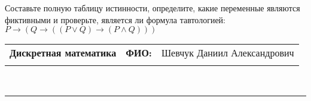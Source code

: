 \documentclass[10pt]{exam}
\newcommand{\class}{Дискретная математика}
\newcommand{\examdate}{}
\begin{document}
\begin{questions}
\begin{enumerate}[a)]
\end{enumerate}\question Составьте полную таблицу истинности, определите, какие переменные являются фиктивными и проверьте, является ли формула тавтологией:
$ P \rightarrow (Q \rightarrow ((P \lor Q) \rightarrow (P \land Q)))$

\end{questions}
\newpage
\begin{flushright}
\begin{tabular}{p{2.8in} r l}
\textbf{\class} & \textbf{ФИО:} &Шевчук Даниил Александрович
\\

\textbf{\examdate} &&\\
\end{tabular}\\
\end{flushright}
\rule[1ex]{\textwidth}{.1pt}
\end{document}
